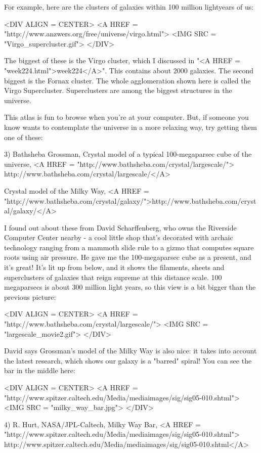 For example, here are the clusters of galaxies 
within 100 million lightyears of us: 

<DIV ALIGN = CENTER>
<A HREF = "http://www.anzwers.org/free/universe/virgo.html">
<IMG SRC = "Virgo_supercluster.gif">
</DIV>

The biggest of these is the Virgo cluster, which I discussed
in "<A HREF = "week224.html">week224</A>".  This contains
about 2000 galaxies.  The second biggest is the Fornax cluster.
The whole agglomeration shown here is called the Virgo Supercluster.
Superclusters are among the biggest structures in the universe.

This atlas is fun to browse when you're at your computer.
But, if someone you know wants to contemplate the universe in a more 
relaxing way, try getting them one of these:

3) Bathsheba Grossman, Crystal model of a typical 100-megaparsec cube
of the universe, <A HREF = "http://www.bathsheba.com/crystal/largescale/">
http://www.bathsheba.com/crystal/largescale/</A>

Crystal model of the Milky Way, 
<A HREF = "http://www.bathsheba.com/crystal/galaxy/">http://www.bathsheba.com/crystal/galaxy/</A>

I found out about these from David Scharffenberg, who owns the Riverside
Computer Center nearby - a cool little shop that's decorated with archaic 
technology ranging from a mammoth slide rule to a gizmo that computes 
square roots using air pressure.  He gave me the 100-megaparsec cube as 
a present, and it's great!  It's lit up from below, and it shows the 
filaments, sheets and superclusters of galaxies that reign supreme 
at this distance scale.  100 megaparsecs is about 300 million light years, 
so this view is a bit bigger than the previous picture:

<DIV ALIGN = CENTER>
<A HREF = "http://www.bathsheba.com/crystal/largescale/">
<IMG SRC = "largescale_movie2.gif">
</DIV>

David says Grossman's model of 
the Milky Way is also nice: it takes into account the latest 
research, which shows our galaxy is a "barred" spiral!  
You can see the bar in the middle here:

<DIV ALIGN = CENTER>
<A HREF = "http://www.spitzer.caltech.edu/Media/mediaimages/sig/sig05-010.shtml">
<IMG SRC = "milky_way_bar.jpg">
</DIV>

4) R. Hurt, NASA/JPL-Caltech, Milky Way Bar, 
<A HREF = 
"http://www.spitzer.caltech.edu/Media/mediaimages/sig/sig05-010.shtml">
http://www.spitzer.caltech.edu/Media/mediaimages/sig/sig05-010.shtml</A>


